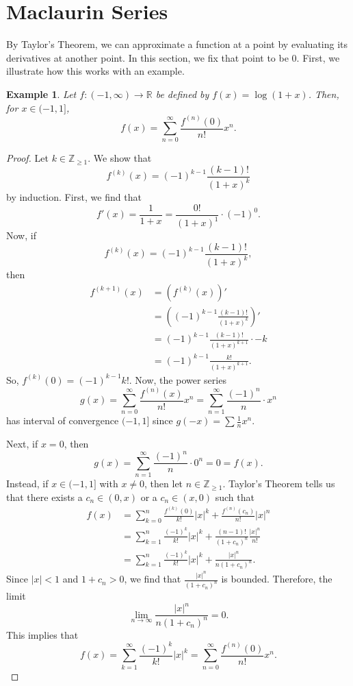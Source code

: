 \documentclass[a4paper, openany]{memoir}
\theoremstyle{definition}
\theoremstyle{plain}
\newtheorem{example}[definition]{Example}
\begin{document}
\newpage

\section{Maclaurin Series}
By Taylor's Theorem, we can approximate a function at a point by evaluating its derivatives at another point. In this section, we fix that point to be 0. First, we illustrate how this works with an example.
\begin{example}
Let $f: (-1, \infty) \to \mathbb{R}$ be defined by $f(x) = \log(1 + x)$. Then, for $x \in (-1, 1]$,
\[f(x) = \sum_{n=0}^{\infty} \frac{f^{(n)}(0)}{n!} x^n.\]
\end{example}
\begin{proof}
Let $k \in \mathbb{Z}_{\geqslant 1}$. We show that
\[f^{(k)}(x) = (-1)^{k-1} \frac{(k-1)!}{(1+x)^k}\]
by induction. First, we find that
\[f'(x) = \frac{1}{1+x} = \frac{0!}{(1+x)^1} \cdot (-1)^0.\]
Now, if
\[f^{(k)}(x) = (-1)^{k-1} \frac{(k-1)!}{(1+x)^k},\]
then
\begin{align*}
    f^{(k+1)}(x) &= (f^{(k)}(x))' \\
    &= \left((-1)^{k-1} \frac{(k-1)!}{(1+x)^k}\right)' \\
    &= (-1)^{k-1} \frac{(k-1)!}{(1+x)^{k+1}} \cdot -k \\
    &= (-1)^{k-1} \frac{k!}{(1+x)^{k+1}}.
\end{align*}
So, $f^{(k)}(0) = (-1)^{k-1} k!$. Now, the power series
\[g(x) = \sum_{n=0}^{\infty} \frac{f^{(n)}(x)}{n!} x^n = \sum_{n=1}^{\infty} \frac{(-1)^n}{n} \cdot x^n\]
has interval of convergence $(-1, 1]$ since $g(-x) = \sum \frac{1}{n} x^n$.

\noindent Next, if $x = 0$, then
\[g(x) = \sum_{n=1}^{\infty} \frac{(-1)^n}{n} \cdot 0^n = 0 = f(x).\]
Instead, if $x \in (-1, 1]$ with $x \neq 0$, then let $n \in \mathbb{Z}_{\geqslant 1}$. Taylor's Theorem tells us that there exists a $c_n \in (0, x)$ or a $c_n \in (x, 0)$ such that
\begin{align*}
    f(x) &= \sum_{k=0}^n \frac{f^{(k)}(0)}{k!} |x|^k + \frac{f^{(n)}(c_n)}{n!} |x|^n \\
    &= \sum_{k=1}^n \frac{(-1)^k}{k!} |x|^k + \frac{(n-1)!}{(1 + c_n)^n} \frac{|x|^n}{n!} \\
    &= \sum_{k=1}^n \frac{(-1)^k}{k!} |x|^k + \frac{|x|^n}{n(1 + c_n)^n}.
\end{align*}
Since $|x| < 1$ and $1 + c_n > 0$, we find that $\frac{|x|^n}{(1 + c_n)^n}$ is bounded. Therefore, the limit
\[\lim_{n \to \infty} \frac{|x|^n}{n(1 + c_n)^n} = 0.\]
This implies that
\[f(x) = \sum_{k=1}^{\infty} \frac{(-1)^k}{k!} |x|^k = \sum_{n=0}^{\infty} \frac{f^{(n)}(0)}{n!} x^n.\]
\end{proof}
\end{document}
